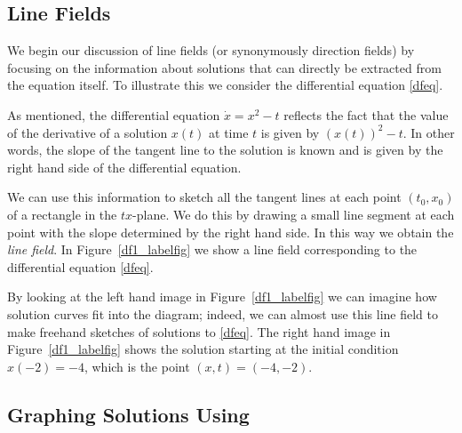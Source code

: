 \documentclass{ximera}
\begin{document}
\subsection*{Line Fields}

We begin our discussion of line fields  (or
synonymously direction fields)  by
focusing on the information about solutions that can directly
be extracted from the equation itself.  To illustrate this we
consider the differential equation \eqref{dfeq}.

As mentioned, the differential equation $\dot{x}=x^2-t$ reflects the fact 
that the value of the derivative of a solution $x(t)$ at time $t$ is
given by $(x(t))^2-t$.  In other words, the slope of the tangent
line to the solution is known and is given by the right hand
side of the differential equation.

We can use this information to sketch all the tangent lines at
each point $(t_0,x_0)$ of a rectangle in the $tx$-plane.  We do
this by drawing a small line segment at each point with the
slope determined by the right hand side.  In this way we obtain the
{\em line field}.  In Figure~\ref{df1_labelfig} we show a
line field corresponding to the differential equation \eqref{dfeq}.

\begin{figure*}[htb]
        \centerline{%
	}
        \caption{Left: Line field for \protect\eqref{dfeq}
              for $t\in [-3,10]$ and $x\in [-4,4]$.
	      Right: a solution starting for $t=-2$ at $x(-2)=-4$.}
        \label{df1_labelfig}
\end{figure*}

By looking at the left hand image in Figure~\ref{df1_labelfig}
we can imagine how solution curves fit into the diagram; indeed,
we can almost use this line field to make freehand sketches
of solutions to \eqref{dfeq}.  The right hand image in
Figure~\ref{df1_labelfig} shows the solution starting at the
initial condition $x(-2) = -4$, which is the point $(x,t)=(-4,-2)$.


\subsection*{Graphing Solutions Using {\dfield}}
\end{document}
